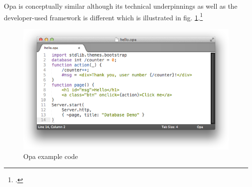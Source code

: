\begin{appendices}
\begin{subappendices}
Opa is conceptually similar although its technical underpinnings as well as the developer-used framework is different which is illustrated in fig. \ref{img:opa}.\footcite{opa}

\begin{figure}[hbtp]
\centering
\includegraphics[scale=0.5]{img/hello-opa-write}
\caption{Opa example code \label{img:opa}}
\end{figure}




\FloatBarrier 

\label{app:benchmark_results}


\end{subappendices}
\end{appendices}
